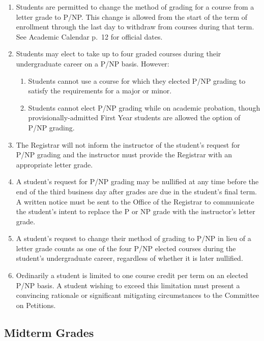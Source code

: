 \documentclass[
  letterpaper,
]{scrbook}
\providecommand{\tightlist}{%
  \setlength{\itemsep}{0pt}\setlength{\parskip}{0pt}}
\begin{document}
\begin{enumerate}
\def\labelenumi{\arabic{enumi}.}
\tightlist
\item
  Students are permitted to change the method of grading for a course
  from a letter grade to P/NP. This change is allowed from the start of
  the term of enrollment through the last day to withdraw from courses
  during that term. See Academic Calendar p.~12 for official dates.
\item
  Students may elect to take up to four graded courses during their
  undergraduate career on a P/NP basis. However:

  \begin{enumerate}
  \def\labelenumii{\alph{enumii}.}
  \tightlist
  \item
    Students cannot use a course for which they elected P/NP grading to
    satisfy the requirements for a major or minor.
  \item
    Students cannot elect P/NP grading while on academic probation,
    though provisionally-admitted First Year students are allowed the
    option of P/NP grading.
  \end{enumerate}
\item
  The Registrar will not inform the instructor of the student's request
  for P/NP grading and the instructor must provide the Registrar with an
  appropriate letter grade.
\item
  A student's request for P/NP grading may be nullified at any time
  before the end of the third business day after grades are due in the
  student's final term. A written notice must be sent to the Office of
  the Registrar to communicate the student's intent to replace the P or
  NP grade with the instructor's letter grade.
\item
  A student's request to change their method of grading to P/NP in lieu
  of a letter grade counts as one of the four P/NP elected courses
  during the student's undergraduate career, regardless of whether it is
  later nullified.
\item
  Ordinarily a student is limited to one course credit per term on an
  elected P/NP basis. A student wishing to exceed this limitation must
  present a convincing rationale or significant mitigating circumstances
  to the Committee on Petitions.
\end{enumerate}

\hypertarget{midterm-grades}{%
\subsection{Midterm Grades}\label{midterm-grades}}
\end{document}
